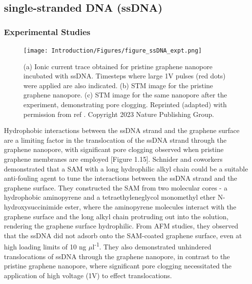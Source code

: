 \subsection{single-stranded DNA (ssDNA)}
\subsubsection{Experimental Studies}
\begin{figure}
    \centering
    \texttt{[image: Introduction/Figures/figure\_ssDNA\_expt.png]}
    \caption[Results from ssDNA - graphene nanopore experiments]{(a) Ionic current trace obtained for pristine graphene nanopore incubated with ssDNA. Timesteps where large 1V pulses (red dots) were applied are also indicated. (b) STM image for the pristine graphene nanopore. (c) STM image for the same nanopore after the experiment, demonstrating pore clogging. Reprinted (adapted) with permission from ref \supercite{schneider_tailoring_2013}. Copyright 2023 Nature Publishing Group.}
    \label{fig:figure15}
\end{figure}

Hydrophobic interactions between the ssDNA strand and the graphene surface are a limiting factor in the translocation of the ssDNA strand through the graphene nanopore, with significant pore clogging observed when pristine graphene membranes are employed [Figure 1.15]. Schnider and coworkers demonstrated that a SAM with a long hydrophilic alkyl chain could be a suitable anti-fouling agent to tune the interactions between the ssDNA strand and the graphene surface.\supercite{schneider_tailoring_2013} They constructed the SAM from two molecular cores - a hydrophobic aminopyrene and a tetraethyleneglycol monomethyl ether N-hydroxysuccinimide ester, where the aminopyrene molecules interact with the graphene surface and the long alkyl chain protruding out into the solution, rendering the graphene surface hydrophilic. From AFM studies, they observed that the ssDNA did not adsorb onto the SAM-coated graphene surface, even at high loading limits of 10 ng $\mu$l\textsuperscript{-1}. They also demonstrated unhindered translocations of ssDNA through the graphene nanopore, in contrast to the pristine graphene nanopore, where significant pore clogging necessitated the application of high voltage (1V) to effect translocations.

